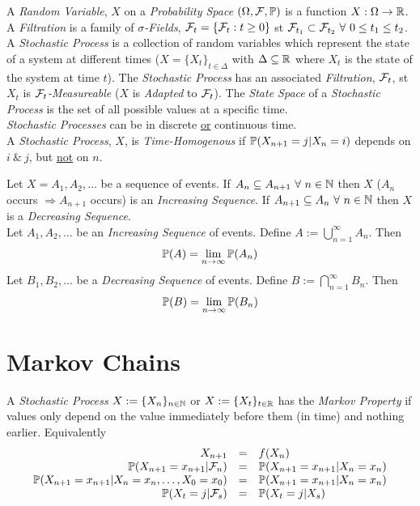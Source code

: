 \documentclass[11pt,a4paper]{article}
\begin{document}
A \textit{Random Variable}, $X$ on a \textit{Probability Space} $(\Omega,\mathcal{F},\mathbb{P})$ is a function $X:\Omega\to\mathbb{R}$.\\

A \textit{Filtration} is a family of \textit{$\sigma$-Fields}, $\mathcal{F}_t=\{\mathcal{F}_t:t\geq0\}$ st $\sigmafield_{t_1}\subset\sigmafield_{t_2}\ \forall\ 0\leq t_1\leq t_2$.\\

A \textit{Stochastic Process} is a collection of random variables which represent the state of a system at different times (\eg $X=\{X_t\}_{t\in\Delta}$ with $\Delta\subseteq\mathbb{R}$ where $X_t$ is the state of the system at time $t$). The \textit{Stochastic Process} has an associated \textit{Filtration}, $\mathcal{F}_t$, st $X_t$ is \textit{$\mathcal{F}_t$-Measureable} ($X$ is \textit{Adapted} to $\mathcal{F}_t$). The \textit{State Space} of a \textit{Stochastic Process} is the set of all possible values at a specific time.\\
\nb \textit{Stochastic Processes} can be in discrete \underline{or} continuous time.\\

A \textit{Stochastic Process}, $X$, is \textit{Time-Homogenous} if $\mathbb{P}(X_{n+1}=j|X_n=i)$ depends on $i\ \&\ j$, but \underline{not} on $n$.

Let $X=A_1,A_2,\dots$ be a sequence of events. If $A_n\subseteq A_{n+1}\ \forall\ n\in\mathbb{N}$ then $X$ (\ie $A_n$ occurs $\Rightarrow A_{n+1}$ occurs) is an \textit{Increasing Sequence}. If $A_{n+1}\subseteq A_n\ \forall\ n\in\mathbb{N}$ then $X$ is a \textit{Decreasing Sequence}.\\

Let $A_1,A_2,\dots$ be an \textit{Increasing Sequence} of events. Define $A:=\bigcup_{n=1}^\infty A_n$. Then
$$\mathbb{P}(A)=\lim_{n\to\infty}\mathbb{P}(A_n)$$
Let $B_1,B_2,\dots$ be a \textit{Decreasing Sequence} of events. Define $B:=\bigcap_{n=1}^\infty B_n$. Then
$$\mathbb{P}(B)=\lim_{n\to\infty}\mathbb{P}(B_n)$$

\section{Markov Chains}

A \textit{Stochastic Process} $X:=\{X_n\}_{n\in\mathbb{N}}$ or $X:=\{X_t\}_{t\in\mathbb{R}}$ has the \textit{Markov Property} if values only depend on the value immediately before them (in time) and nothing earlier. Equivalently
\[\begin{array}{rcl}
X_{n+1}&=&f(X_n)\\
\mathbb{P}(X_{n+1}=x_{n+1}|\mathcal{F}_n)&=&\mathbb{P}(X_{n+1}=x_{n+1}|X_n=x_n)\\
\mathbb{P}(X_{n+1}=x_{n+1}|X_n=x_n,\dots,X_0=x_0)&=&\mathbb{P}(X_{n+1}=x_{n+1}|X_n=x_n)\\
\mathbb{P}(X_t=j|\mathcal{F}_s)&=&\mathbb{P}(X_t=j|X_s)
\end{array}\]
\end{document}
